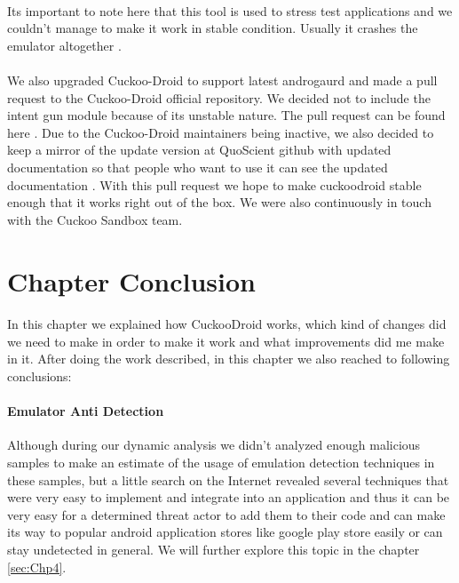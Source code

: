 \documentclass[../main.tex]{subfile}
\begin{document}
		\paragraph{} Its important to note here that this tool is used to stress test applications and we couldn't manage to make it work in stable condition. Usually it crashes the emulator altogether \cite{issue52}.
		
		\paragraph{} We also upgraded Cuckoo-Droid to support latest androgaurd and made a pull request to the Cuckoo-Droid official repository\cite{cuckoodroid_github}. We decided not to include the intent gun module because of its unstable nature. The pull request can be found here \cite{cuckoodroid_pullreq}. Due to the Cuckoo-Droid maintainers being inactive, we also decided to keep a mirror of the update version at QuoScient github with updated documentation so that people who want to use it can see the updated documentation \cite{cuckoodroid_quoscient}. With this pull request we hope to make cuckoodroid stable enough that it works right out of the box. We were also continuously in touch with the Cuckoo Sandbox team.
		
		\section{Chapter Conclusion}
		\paragraph{} In this chapter we explained how CuckooDroid works, which kind of changes did we need to make in order to make it work and what improvements did me make in it. After doing the work described, in this chapter we also reached to following conclusions:
		\paragraph{Emulator Anti Detection} Although during our dynamic analysis we didn't analyzed enough malicious samples to make an estimate of the usage of emulation detection techniques in these samples, but a little search on the Internet revealed several techniques that were very easy to implement and integrate into an application and thus it can be very easy for a determined threat actor to add them to their code and can make its way to popular android application stores like google play store easily or can stay undetected in general. We will further explore this topic in the chapter \ref{sec:Chp4}.
		
\end{document}
